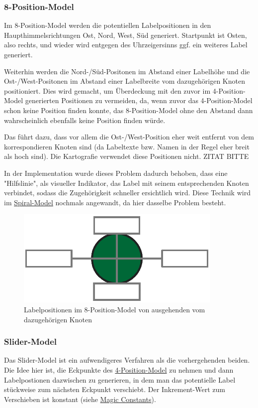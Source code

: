 \subsubsection{8-Position-Model}
\label{subsubsec:8pos}
Im 8-Position-Model werden die potentiellen Labelpositionen in den Haupthimmelsrichtungen Ost, Nord, West, Süd generiert.
Startpunkt ist Osten, also rechts, und wieder wird entgegen des Uhrzeigersinns ggf. ein weiteres Label generiert.

Weiterhin werden die Nord-/Süd-Positonen im Abstand einer Labelhöhe und die Ost-/West-Positonen im Abstand einer Labelbreite vom dazugehörigen Knoten positioniert.
Dies wird gemacht, um Überdeckung mit den zuvor im 4-Position-Model generierten Positionen zu vermeiden, da, wenn zuvor das 4-Position-Model schon keine Position finden konnte,
das 8-Position-Model ohne den Abstand dann wahrscheinlich ebenfalls keine Position finden würde.

Das führt dazu, dass vor allem die Ost-/West-Position eher weit entfernt von dem korrespondieren Knoten sind (da Labeltexte bzw. Namen in der Regel eher breit als hoch sind).
Die Kartografie verwendet diese Positionen nicht. ZITAT BITTE

In der Implementation wurde dieses Problem dadurch behoben, dass eine "Hilfslinie", als visueller Indikator, das Label mit seinem entsprechenden Knoten verbindet,
sodass die Zugehörigkeit schneller ersichtlich wird.
Diese Technik wird im \hyperref[subsubsec:spiral]{Spiral-Model} nochmals angewandt, da hier dasselbe Problem besteht.

\begin{figure}[H]
    \centering
    \includegraphics[scale=0.4]{../img/8pos}
    \caption{Labelpositionen im 8-Position-Model von ausgehenden vom dazugehörigen Knoten}
    \label{fig:8pos}
\end{figure}

\subsubsection{Slider-Model}
\label{subsubsec:slider}
Das Slider-Model ist ein aufwendigeres Verfahren als die vorhergehenden beiden. Die Idee hier ist, die Eckpunkte des \hyperref[subsubsec:4pos]{4-Position-Model} zu nehmen
und dann Labelpostionen dazwischen zu generieren, in dem man das potentielle Label stückweise zum nächsten Eckpunkt verschiebt. Der Inkrement-Wert zum Verschieben ist konstant (siehe \hyperref[subsec:consts]{Magic Constants}).

